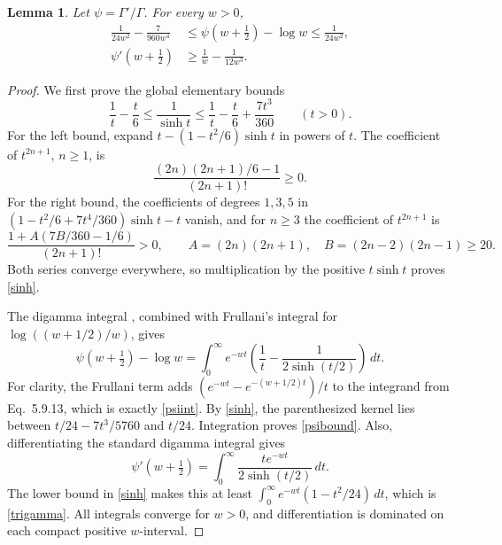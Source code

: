 \documentclass[11pt]{article}
\newtheorem{lemma}{Lemma}
\begin{document}
\begin{lemma}\label{psi}
Let \(\psi=\Gamma'/\Gamma\). For every \(w>0\),
\begin{align}
 \frac1{24w^2}-\frac7{960w^4}
 &\leq\psi(w+\tfrac12)-\log w\leq\frac1{24w^2}, \label{psibound}\\
 \psi'(w+\tfrac12)&\geq\frac1w-\frac1{12w^3}.   \label{trigamma}
\end{align}
\end{lemma}
\begin{proof}
We first prove the global elementary bounds
\begin{equation}\label{sinh}
 \frac1t-\frac t6\leq\frac1{\sinh t}
 \leq\frac1t-\frac t6+\frac{7t^3}{360}\qquad(t>0).
\end{equation}
For the left bound, expand
\(t-(1-t^2/6)\sinh t\) in powers of \(t\).
The coefficient of \(t^{2n+1}\), \(n\geq1\), is
\[
 \frac{(2n)(2n+1)/6-1}{(2n+1)!}\geq0.
\]
For the right bound, the coefficients of degrees \(1,3,5\) in
\((1-t^2/6+7t^4/360)\sinh t-t\) vanish, and for \(n\geq3\)
the coefficient of \(t^{2n+1}\) is
\[
 \frac{1+A(7B/360-1/6)}{(2n+1)!}>0,
 \qquad A=(2n)(2n+1),\quad B=(2n-2)(2n-1)\geq20.
\]
Both series converge everywhere, so multiplication by the positive
\(t\sinh t\) proves \eqref{sinh}.

The digamma integral \cite[Eq.~5.9.13]{DLMF}, combined with
Frullani's integral for \(\log((w+1/2)/w)\), gives
\begin{equation}\label{psiint}
 \psi(w+\tfrac12)-\log w
 =\int_0^\infty e^{-wt}
       \left(\frac1t-\frac1{2\sinh(t/2)}\right)\,dt.
\end{equation}
For clarity, the Frullani term adds
\((e^{-wt}-e^{-(w+1/2)t})/t\) to the integrand from
Eq.~5.9.13, which is exactly \eqref{psiint}.
By \eqref{sinh}, the parenthesized kernel lies between
\(t/24-7t^3/5760\) and \(t/24\).
Integration proves \eqref{psibound}.
Also, differentiating the standard digamma integral
\cite[Eq.~5.9.16]{DLMF} gives
\[
 \psi'(w+\tfrac12)
 =\int_0^\infty\frac{t e^{-wt}}{2\sinh(t/2)}\,dt.
\]
The lower bound in \eqref{sinh} makes this at least
\(\int_0^\infty e^{-wt}(1-t^2/24)\,dt\), which is
\eqref{trigamma}. All integrals converge for \(w>0\), and
differentiation is dominated on each compact positive \(w\)-interval.
\end{proof}
\end{document}
